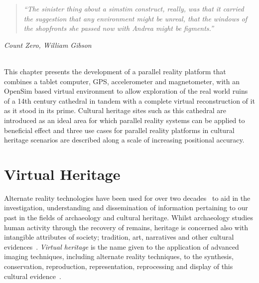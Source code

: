 \begin{quote}
	\textit{``The sinister thing about a simstim construct, really, was that it carried the suggestion that any environment might be unreal, that the windows of the shopfronts she passed now with Andrea might be figments.''}
\end{quote}
\hfill \textit{Count Zero, William Gibson}
\\
\\


\label{chapter-vtw}

This chapter presents the development of a parallel reality platform that combines a tablet computer, GPS, accelerometer and magnetometer, with an OpenSim based virtual environment to allow exploration of the real world ruins of a 14th century cathedral in tandem with a complete virtual reconstruction of it as it stood in its prime. Cultural heritage sites such as this cathedral are introduced as an ideal area for which parallel reality systems can be applied to beneficial effect and three use cases for parallel reality platforms in cultural heritage scenarios are described along a scale of increasing positional accuracy.


\section{Virtual Heritage}

Alternate reality technologies have been used for over two decades~\cite{Roussou2002} to aid in the investigation, understanding and dissemination of information pertaining to our past in the fields of archaeology and cultural heritage. Whilst archaeology studies human activity through the recovery of remains, heritage is concerned also with intangible attributes of society; tradition, art, narratives and other cultural evidences~\cite{Roussou2002}. \textit{Virtual heritage} is the name given to the application of advanced imaging techniques, including alternate reality techniques, to the synthesis, conservation, reproduction, representation, reprocessing and display of this cultural evidence~\cite{roussou:photorealism}.

